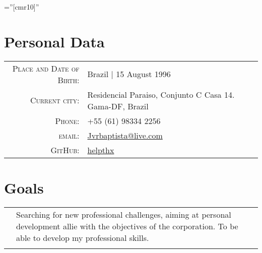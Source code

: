 \documentclass[a4paper,10pt]{article} %
\begin{document}
\pagestyle{empty} %

\font\fb=''[cmr10]'' %


\par{\bigskip\par} %

\section{Personal Data}

\begin{tabular}{rl}
\textsc{Place and Date of Birth:} & Brazil  | 15 August 1996 \\
\textsc{Current city:} & Residencial Paraiso, Conjunto C Casa 14. Gama-DF, Brazil \\
\textsc{Phone:} & +55 (61) 98334 2256\\
\textsc{email:} & \href{mailto:Jvrbaptista@live.com}{Jvrbaptista@live.com} \\
\textsc{GitHub:} & \href{https://github.com/helpthx}{helpthx}
\end{tabular}


\section{Goals}
\begin{tabular}{r|p{11cm}}
& \footnotesize{Searching for new professional challenges, aiming at personal development
allie with the objectives of the corporation. To be able to develop my
professional skills.}\\
\multicolumn{2}{c}{} \\
\end{tabular}

\end{document}
